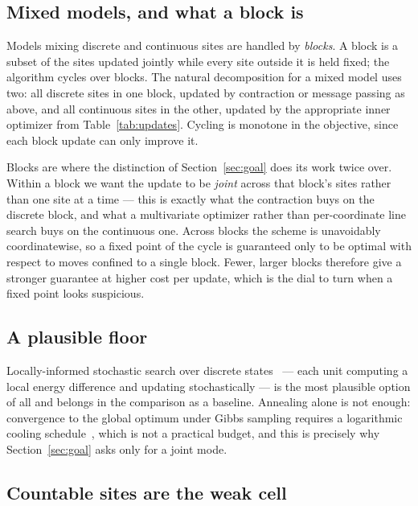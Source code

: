 \subsection{Mixed models, and what a block is}
\label{sec:blocks}

Models mixing discrete and continuous sites are handled by \emph{blocks}. A block is a subset of the sites updated jointly while every site outside it is held fixed; the algorithm cycles over blocks. The natural decomposition for a mixed model uses two: all discrete sites in one block, updated by contraction or message passing as above, and all continuous sites in the other, updated by the appropriate inner optimizer from Table~\ref{tab:updates}. Cycling is monotone in the objective, since each block update can only improve it.

Blocks are where the distinction of Section~\ref{sec:goal} does its work twice over. Within a block we want the update to be \emph{joint} across that block's sites rather than one site at a time --- this is exactly what the contraction buys on the discrete block, and what a multivariate optimizer rather than per-coordinate line search buys on the continuous one. Across blocks the scheme is unavoidably coordinatewise, so a fixed point of the cycle is guaranteed only to be optimal with respect to moves confined to a single block. Fewer, larger blocks therefore give a stronger guarantee at higher cost per update, which is the dial to turn when a fixed point looks suspicious.

\subsection{A plausible floor}

Locally-informed stochastic search over discrete states~\citep{Sun2023} --- each unit computing a local energy difference and updating stochastically --- is the most plausible option of all and belongs in the comparison as a baseline. Annealing alone is not enough: convergence to the global optimum under Gibbs sampling requires a logarithmic cooling schedule~\citep{Geman1984}, which is not a practical budget, and this is precisely why Section~\ref{sec:goal} asks only for a joint mode.

\subsection{Countable sites are the weak cell}
\label{sec:countable}

